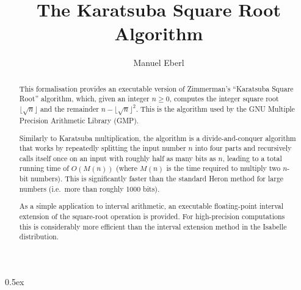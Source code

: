 \documentclass[11pt,a4paper]{article}
\begin{document}
\title{The Karatsuba Square Root Algorithm}
\author{Manuel Eberl}
\maketitle

\begin{abstract}
This formalisation provides an executable version of Zimmerman's ``Karatsuba Square Root''
algorithm, which, given an integer $n \geq 0$, computes the integer square root
$\lfloor \sqrt{n}\rfloor$ and the remainder $n - \lfloor \sqrt{n}\rfloor^2$.
This is the algorithm used by the GNU Multiple Precision Arithmetic Library (GMP).

Similarly to Karatsuba multiplication, the algorithm is a divide-and-conquer algorithm that
works by repeatedly splitting the input number $n$ into four parts and recursively calls
itself once on an input with roughly half as many bits as $n$, leading to a total running time
of $O(M(n))$ (where $M(n)$ is the time required to multiply two $n$-bit numbers).
This is significantly faster than the standard Heron method for large numbers (i.e.\ more than
roughly 1000 bits).

As a simple application to interval arithmetic, an executable floating-point interval 
extension of the square-root operation is provided. For high-precision computations this 
is considerably more efficient than the interval extension method in the Isabelle distribution.
\end{abstract}

\tableofcontents

\newpage
\parindent 0pt\parskip 0.5ex



\nocite{zimmermann99}
\nocite{bertot02}
\raggedright


\end{document}
